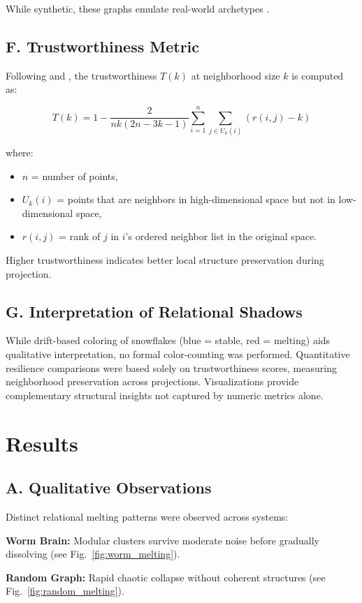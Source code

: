 \documentclass[conference]{IEEEtran}
\begin{document}
While synthetic, these graphs emulate real-world archetypes \cite{sporns,newman,barabasi_albert}.

\subsection*{\textbf{F. Trustworthiness Metric}}
Following \cite{umap} and \cite{tsne}, the trustworthiness $T(k)$ at neighborhood size $k$ is computed as:

\[
T(k) = 1 - \frac{2}{n k (2n - 3k - 1)} \sum_{i=1}^{n} \sum_{j \in U_k(i)} (r(i, j) - k)
\]

where:
\begin{itemize}
    \item $n$ = number of points,
    \item $U_k(i)$ = points that are neighbors in high-dimensional space but not in low-dimensional space,
    \item $r(i, j)$ = rank of $j$ in $i$'s ordered neighbor list in the original space.
\end{itemize}

Higher trustworthiness indicates better local structure preservation during projection.

\subsection*{\textbf{G. Interpretation of Relational Shadows}}
While drift-based coloring of snowflakes (blue = stable, red = melting) aids qualitative interpretation, no formal color-counting was performed. Quantitative resilience comparisons were based solely on trustworthiness scores, measuring neighborhood preservation across projections. Visualizations provide complementary structural insights not captured by numeric metrics alone.
\section{Results}

\subsection*{\textbf{A. Qualitative Observations}}
Distinct relational melting patterns were observed across systems:

\textbf{Worm Brain:} Modular clusters survive moderate noise before gradually dissolving (see Fig.~\ref{fig:worm_melting}).

\textbf{Random Graph:} Rapid chaotic collapse without coherent structures (see Fig.~\ref{fig:random_melting}).
\end{document}
